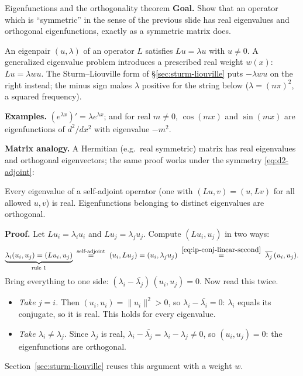 \documentclass[11pt]{beamer}
\begin{document}
\begin{frame}[allowframebreaks=1.00]{Eigenfunctions and the orthogonality theorem}
\footnotesize
\textbf{Goal.} Show that an operator which is ``symmetric'' in the sense of the previous slide has real
eigenvalues and orthogonal eigenfunctions, exactly as a symmetric matrix does.

An eigenpair $(u,\lambda)$ of an operator $L$ satisfies $Lu=\lambda u$ with
$u\neq0$.  A generalized eigenvalue problem introduces a prescribed real weight
$w(x)$: $Lu=\lambda wu$.  The Sturm--Liouville form of \S\ref{sec:sturm-liouville} puts $-\lambda wu$ on the
right instead; the minus sign makes $\lambda$ positive for the string below
($\lambda=(n\pi)^2$, a squared frequency).

\textbf{Examples.} $(e^{\lambda x})'=\lambda e^{\lambda x}$; and for real $m\neq0$,
$\cos(mx)$ and $\sin(mx)$ are eigenfunctions of $d^2/dx^2$ with eigenvalue $-m^2$.

\textbf{Matrix analogy.} A Hermitian (e.g.\ real symmetric) matrix has real
eigenvalues and orthogonal eigenvectors; the same proof works under the symmetry
\eqref{eq:d2-adjoint}:

\begin{theorem}
Every eigenvalue of a self-adjoint operator (one with $(Lu,v)=(u,Lv)$ for all allowed $u,v$) is real.  Eigenfunctions belonging to
distinct eigenvalues are orthogonal.
\end{theorem}

\textbf{Proof.} Let \(Lu_i=\lambda_i u_i\) and \(Lu_j=\lambda_j u_j\). Compute \((Lu_i,u_j)\) in two ways:
\[
  \underbrace{\lambda_i(u_i,u_j)=(Lu_i,u_j)}_{\text{rule 1}}
  \;\overset{\text{self-adjoint}}{=}\;(u_i,Lu_j)=(u_i,\lambda_j u_j)
  \;\overset{\eqref{eq:ip-conj-linear-second}}{=}\;\overline{\lambda_j}\,(u_i,u_j).
\]
Bring everything to one side: \((\lambda_i-\overline{\lambda_j})\,(u_i,u_j)=0\). Now read this twice.
\begin{itemize}
  \item \emph{Take \(j=i\).} Then \((u_i,u_i)=\|u_i\|^2>0\), so \(\lambda_i-\overline{\lambda_i}=0\): \(\lambda_i\) equals its
        conjugate, so it is real. This holds for every eigenvalue.
  \item \emph{Take \(\lambda_i\ne\lambda_j\).} Since \(\lambda_j\) is real, \(\lambda_i-\overline{\lambda_j}=\lambda_i-\lambda_j\ne0\), so
        \((u_i,u_j)=0\): the eigenfunctions are orthogonal.
\end{itemize}
Section~\ref{sec:sturm-liouville} reuses this argument with a weight \(w\).


\end{frame}
\end{document}
